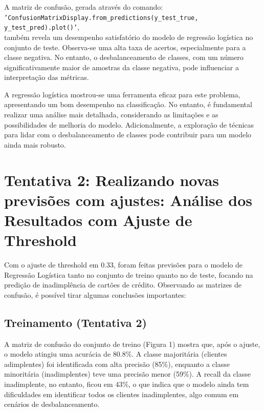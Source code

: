 \documentclass{abntpuc}
\begin{document}
A matriz de confusão, gerada através do comando: \\
\texttt{'ConfusionMatrixDisplay.from\_predictions(y\_test\_true, y\_test\_pred).plot()'},\\também revela um desempenho satisfatório do modelo de regressão logística no conjunto de teste. Observa-se uma alta taxa de acertos, especialmente para a classe negativa. No entanto, o desbalanceamento de classes, com um número significativamente maior de amostras da classe negativa, pode influenciar a interpretação das métricas.

A regressão logística mostrou-se uma ferramenta eficaz para este problema, apresentando um bom desempenho na classificação. No entanto, é fundamental realizar uma análise mais detalhada, considerando as limitações e as possibilidades de melhoria do modelo. Adicionalmente, a exploração de técnicas para lidar com o desbalanceamento de classes pode contribuir para um modelo ainda mais robusto.

\section*{\centering\large\textbf{Tentativa 2: Realizando novas previsões com ajustes: Análise dos Resultados com Ajuste de Threshold}}

Com o ajuste de threshold em 0.33, foram feitas previsões para o modelo de Regressão Logística tanto no conjunto de treino quanto no de teste, focando na predição de inadimplência de cartões de crédito. Observando as matrizes de confusão, é possível tirar algumas conclusões importantes:

\subsection*{\centering\large\textbf{Treinamento (Tentativa 2)}}

A matriz de confusão do conjunto de treino (Figura 1) mostra que, após o ajuste, o modelo atingiu uma acurácia de 80.8\%. A classe majoritária (clientes adimplentes) foi identificada com alta precisão (85\%), enquanto a classe minoritária (inadimplentes) teve uma precisão menor (59\%). A recall da classe inadimplente, no entanto, ficou em 43\%, o que indica que o modelo ainda tem dificuldades em identificar todos os clientes inadimplentes, algo comum em cenários de desbalanceamento.
\end{document}
